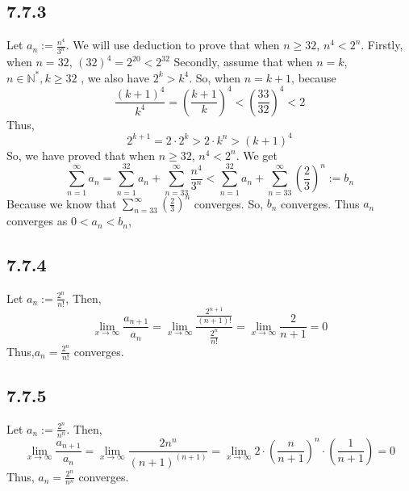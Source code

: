 \documentclass[11pt,twoside,a4paper]{article}
\begin{document}
\subsection{7.7.3}
Let $\displaystyle a_{n}:=\frac{n^4}{3^n}$. We will use deduction to 
prove that when $n \ge 32$, $n^4<2^n$.
\newline
Firstly, when $n=32$, $(32)^4=2^{20}<2^{32}$
\newline
Secondly, assume that when $n=k$,$n \in \mathbb{N}^*,k\ge 32$
, we also have $2^k>k^4$.
\newline
So, when $n=k+1$, because
$$\frac{(k+1)^4}{k^4}=(\frac{k+1}{k})^4<(\frac{33}{32})^4<2$$
Thus, 
$$2^{k+1}=2\cdot 2^{k}>2\cdot k^n >(k+1)^4$$
So, we have proved that when $n \ge 32$, $n^4<2^n$.
\newline
We get 
$$\sum_{n = 1}^{\infty} a_{n} =\sum_{n = 1}^{32} a_{n} 
+\sum_{n = 33}^{\infty}\frac{n^4}{3^n}
<\sum_{n = 1}^{32}a_{n}+
\sum_{n = 33}^{\infty} (\frac{2}{3})^n:=b_{n} $$
\newline
Because we know that $\displaystyle \sum_{n = 33}^{\infty} (\frac{2}{3})^n$
converges.
So, $b_{n}$ converges. Thus $a_{n}$ converges as $0<a_{n}<b_{n}$,

\subsection{7.7.4}
Let $\displaystyle a_{n}:=\frac{2^n}{n!}$, Then, 
$$\displaystyle 
\lim_{x \to \infty} \frac{a_{n+1}}{a_{n}}
=\lim_{x \to \infty}\frac{\frac{2^{n+1}}{(n+1)!}}{\frac{2^n}{n!}} 
=\lim_{x \to \infty} \frac{2}{n+1}=0$$
Thus,$\displaystyle a_{n}=\frac{2^n}{n!}$ converges.

\subsection{7.7.5}
Let $\displaystyle a_{n}:=\frac{2^n}{n^n}$. Then,
$$\displaystyle \lim_{x \to \infty} \frac{a_{n+1}}{a_{n}}
=\lim_{x \to \infty} \frac{2n^n}{(n+1)^(n+1)}
=\lim_{x \to \infty} 2\cdot(\frac{n}{n+1})^n \cdot (\frac{1}{n+1})
=0 $$
Thus, $\displaystyle a_{n}=\frac{2^n}{n^n}$ converges.
\end{document}
